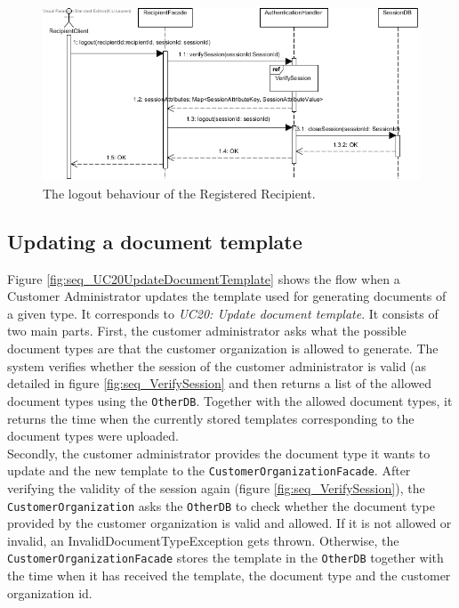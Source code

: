 \documentclass[a4paper,10pt]{article}
\begin{document}
\begin{figure}[!htp]
    \centering
    \includegraphics[width=\textwidth]{Seq_UC2LogOut.png}
    \caption{The logout behaviour of the Registered Recipient.
        }\label{fig:seq_UC2LogOut}
\end{figure}



\subsection{Updating a document template}
Figure \ref{fig:seq_UC20UpdateDocumentTemplate} shows the flow when a Customer Administrator updates the template used for generating documents of a given type. It corresponds to \emph{UC20: Update document template}. It consists of two main parts. First, the customer administrator asks what the possible document types are that the customer organization is allowed to generate. The system verifies whether the session of the customer administrator is valid (as detailed in figure \ref{fig:seq_VerifySession} and then returns a list of the allowed document types using the \texttt{OtherDB}.  Together with the allowed document types, it returns the  time when the currently stored templates corresponding to the document types were uploaded.\\
Secondly, the customer administrator provides the document type it wants to update and the new template to the \texttt{CustomerOrganizationFacade}. After verifying the validity of the session again (figure \ref{fig:seq_VerifySession}), the \texttt{CustomerOrganization} asks the \texttt{OtherDB} to check whether the document type provided by the customer organization is valid and allowed. If it is not allowed or invalid, an InvalidDocumentTypeException gets thrown. Otherwise, the \texttt{CustomerOrganizationFacade} stores the template in the \texttt{OtherDB} together with the time when it has received the template, the document type and the customer organization id.
\end{document}
